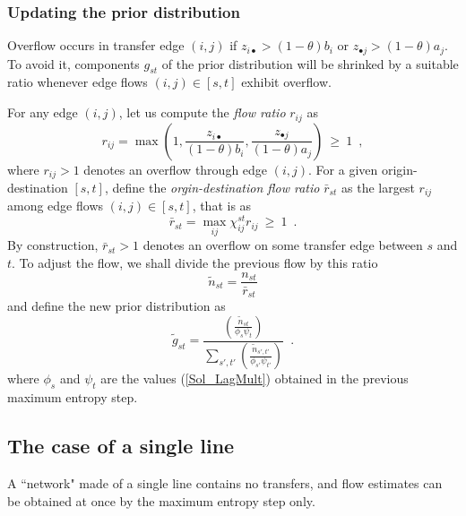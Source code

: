 \documentclass{bmcart}
\begin{document}
\subsubsection{Updating the prior distribution}
\label{priorup}
Overflow occurs in transfer edge $(i, j)$ if  $z_{i \bullet} > (1 - \theta)b_i$ or $z_{\bullet j} > (1 - \theta)a_j$. To avoid it, components $g_{st}$ of the prior distribution 
will be shrinked by a suitable ratio whenever edge flows $(i,j)\in [s,t]$ exhibit overflow. 


 For any edge $(i, j)$, let us compute the \emph{flow ratio} $r_{ij}$ as
\begin{equation}
	\label{flow_ratio}
	r_{ij} = \max \left(1, \frac{z_{i \bullet}}{(1 - \theta)b_i}, \frac{z_{\bullet j}}{(1 - \theta)a_j} \right)\: \ge\: 1\enspace,
\end{equation}
where $r_{ij} > 1$ denotes an overflow through edge $(i, j)$. For a given origin-destination $[s,t]$, define the \emph{orgin-destination flow ratio} $\bar{r}_{st}$ 
as the largest $r_{ij}$ among edge flows $(i,j)\in [s,t]$, that is as 
\begin{equation}
	\label{st_flow_ratio}
	\bar{r}_{st} = \max_{ij} \chi_{ij}^{st} r_{ij}\: \ge\: 1\enspace.
\end{equation}
By construction, $\bar{r}_{st} > 1$ denotes an overflow on some transfer edge between $s$ and $t$. To adjust the flow, we shall divide the previous flow by this ratio
\begin{equation}
	\label{update_flow}
	\widetilde{n}_{st} =\frac{n_{st}}{\bar{r}_{st}}
\end{equation}
and define the new prior distribution  as
\begin{equation}
	\label{update_distrib}
	\widetilde{g}_{st} = \frac{\left( \frac{\widetilde{n}_{st}}{\phi_s \psi_t} \right)}{\sum_{s',t'} \left( \frac{\widetilde{n}_{s',t'}}{\phi_{s'} \psi_{t'}} \right)}\enspace. 
\end{equation}
where $\phi_s$ and $\psi_t$ are the values (\ref{Sol_LagMult}) obtained in the previous maximum entropy step. 





\subsection{The case of a single line}
\label{Single line}
A ``network" made of a single line contains no transfers, and flow estimates can be obtained at once by the maximum entropy step only.
\end{document}
